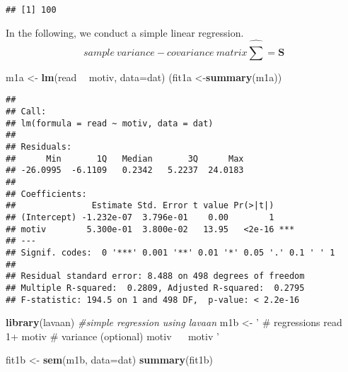 \documentclass[]{book}
\newenvironment{Shaded}{\begin{snugshade}}{\end{snugshade}}
\newcommand{\CommentTok}[1]{\textcolor[rgb]{0.56,0.35,0.01}{\textit{#1}}}
\newcommand{\DataTypeTok}[1]{\textcolor[rgb]{0.13,0.29,0.53}{#1}}
\newcommand{\KeywordTok}[1]{\textcolor[rgb]{0.13,0.29,0.53}{\textbf{#1}}}
\newcommand{\NormalTok}[1]{#1}
\newcommand{\OperatorTok}[1]{\textcolor[rgb]{0.81,0.36,0.00}{\textbf{#1}}}
\newcommand{\StringTok}[1]{\textcolor[rgb]{0.31,0.60,0.02}{#1}}
\begin{document}
\begin{Shaded}
\end{Shaded}

\begin{verbatim}
## [1] 100
\end{verbatim}

In the following, we conduct a simple linear regression.
\[sample \ variance-covariance \ matrix \hat{\sum} = \mathbf{S} \]

\begin{Shaded}
\begin{Highlighting}[]
\NormalTok{m1a <-}\StringTok{ }\KeywordTok{lm}\NormalTok{(read }\OperatorTok{~}\StringTok{ }\NormalTok{motiv, }\DataTypeTok{data=}\NormalTok{dat)}
\NormalTok{(fit1a <-}\KeywordTok{summary}\NormalTok{(m1a))}
\end{Highlighting}
\end{Shaded}

\begin{verbatim}
## 
## Call:
## lm(formula = read ~ motiv, data = dat)
## 
## Residuals:
##      Min       1Q   Median       3Q      Max 
## -26.0995  -6.1109   0.2342   5.2237  24.0183 
## 
## Coefficients:
##               Estimate Std. Error t value Pr(>|t|)    
## (Intercept) -1.232e-07  3.796e-01    0.00        1    
## motiv        5.300e-01  3.800e-02   13.95   <2e-16 ***
## ---
## Signif. codes:  0 '***' 0.001 '**' 0.01 '*' 0.05 '.' 0.1 ' ' 1
## 
## Residual standard error: 8.488 on 498 degrees of freedom
## Multiple R-squared:  0.2809, Adjusted R-squared:  0.2795 
## F-statistic: 194.5 on 1 and 498 DF,  p-value: < 2.2e-16
\end{verbatim}

\begin{Shaded}
\begin{Highlighting}[]
\KeywordTok{library}\NormalTok{(lavaan)}
\CommentTok{#simple regression using lavaan }
\NormalTok{m1b <-}\StringTok{   '}
\StringTok{  # regressions}
\StringTok{    read ~ 1+ motiv}
\StringTok{  # variance (optional)}
\StringTok{    motiv ~~ motiv}
\StringTok{'}

\NormalTok{fit1b <-}\StringTok{ }\KeywordTok{sem}\NormalTok{(m1b, }\DataTypeTok{data=}\NormalTok{dat)}
\KeywordTok{summary}\NormalTok{(fit1b)}
\end{Highlighting}
\end{Shaded}
\end{document}
